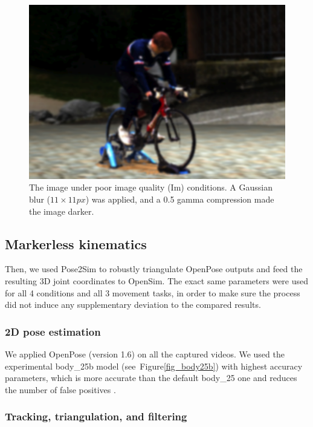 \begin{figure}[!ht]
	\centering
	\def\svgwidth{1\columnwidth}
	\fontsize{10pt}{10pt}\selectfont
	\includegraphics[width=\linewidth]{"../Chap4/Figures/Fig_ImQuality.png"}
	\caption{The image under poor image quality (Im) conditions. A Gaussian blur (\(11 \times 11 px\)) was applied, and a 0.5 gamma compression made the image darker.}
	\label{fig_imquality}
\end{figure}


\subsection{Markerless kinematics}

Then, we used Pose2Sim to robustly triangulate OpenPose outputs and feed the resulting 3D joint coordinates to OpenSim. The exact same parameters were used for all 4 conditions and all 3 movement tasks, in order to make sure the process did not induce any supplementary deviation to the compared results.

\subsubsection{2D pose estimation}

We applied OpenPose (version 1.6) on all the captured videos. We used the experimental body\_25b model (see~Figure\ref{fig_body25b}) with highest accuracy parameters, which is more accurate than the default body\_25 one and reduces the number of false positives \cite{Hidalgo2019}.

\subsubsection{Tracking, triangulation, and filtering}

